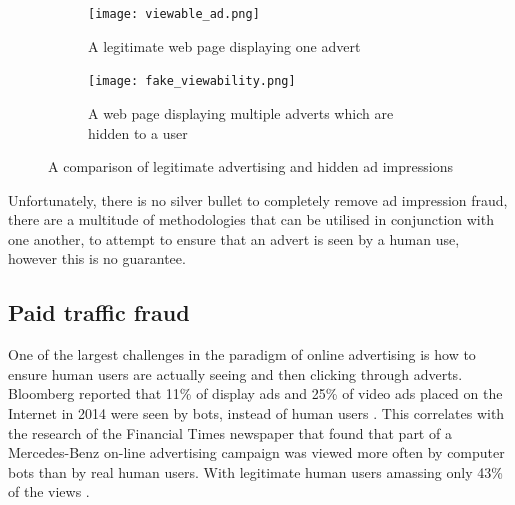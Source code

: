 \documentclass[12pt]{article}
\begin{document}
\begin{figure}[H]
    \begin{subfigure}{0.3\textwidth}
        \texttt{[image: viewable\_ad.png]}
        \caption{A legitimate web page displaying one advert \parencite{spiderIo}}
        \label{fig:legitAd}
    \end{subfigure} \hspace{0.2\textwidth}
    \begin{subfigure}{0.3\textwidth}
        \texttt{[image: fake\_viewability.png]}
        \caption{A web page displaying multiple adverts which are hidden to a user \parencite{spiderIo}}
        \label{fig:adFraud}
    \end{subfigure}
    \caption{A comparison of legitimate advertising and hidden ad impressions}
    \label{fig:adstack}
\end{figure}

Unfortunately, there is no silver bullet to completely remove ad impression fraud, there are a multitude of methodologies that can be utilised in conjunction with one another, to attempt to ensure that an advert is seen by a human use, however this is no guarantee. 

\subsection{Paid traffic fraud}
One of the largest challenges in the paradigm of online advertising is how to ensure human users are actually seeing and then clicking through adverts. Bloomberg reported that 11\% of display ads and 25\% of video ads placed on the Internet in 2014 were seen by bots, instead of human users \parencite{bloomFraud}. This correlates with the research of the Financial Times newspaper that found that part of a Mercedes-Benz on-line advertising campaign was viewed more often by computer bots than by real human users. With legitimate human users amassing only 43\% of the views \parencite{mercFraud}. \\
\end{document}
